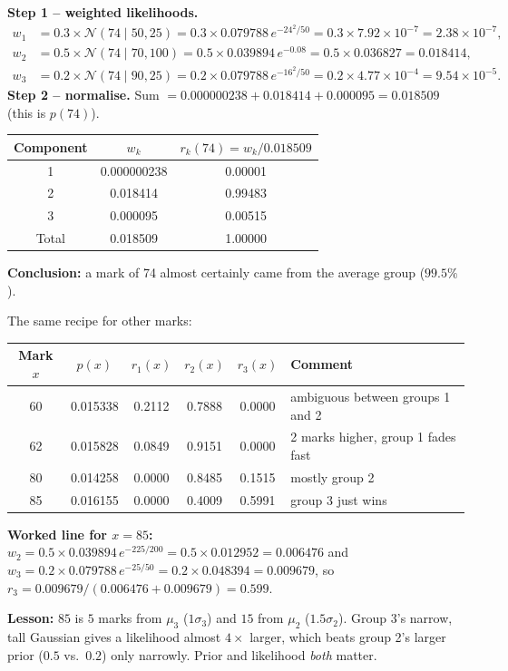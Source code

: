 \documentclass[11pt,a4paper]{article}
\newcommand{\N}{\mathcal{N}}
\begin{document}
\begin{example}
\textbf{Step 1 -- weighted likelihoods.}
\begin{align*}
w_1&=0.3\times\N(74\mid50,25)=0.3\times0.079788\,e^{-24^2/50}=0.3\times7.92\times10^{-7}=2.38\times10^{-7},\\
w_2&=0.5\times\N(74\mid70,100)=0.5\times0.039894\,e^{-0.08}=0.5\times0.036827=0.018414,\\
w_3&=0.2\times\N(74\mid90,25)=0.2\times0.079788\,e^{-16^2/50}=0.2\times4.77\times10^{-4}=9.54\times10^{-5}.
\end{align*}
\textbf{Step 2 -- normalise.} Sum $=0.000000238+0.018414+0.000095=0.018509$ (this is $p(74)$).
\begin{center}
\begin{tabular}{@{}ccc@{}}
\toprule
Component & $w_k$ & $r_k(74)=w_k/0.018509$\\
\midrule
1 & 0.000000238 & 0.00001\\
2 & 0.018414 & 0.99483\\
3 & 0.000095 & 0.00515\\
\midrule
Total & 0.018509 & 1.00000\\
\bottomrule
\end{tabular}
\end{center}
\textbf{Conclusion:} a mark of 74 almost certainly came from the average group ($99.5\%$).
\end{example}

\begin{example}
The same recipe for other marks:
\begin{center}
\begin{tabular}{@{}cccccl@{}}
\toprule
Mark $x$ & $p(x)$ & $r_1(x)$ & $r_2(x)$ & $r_3(x)$ & Comment\\
\midrule
60 & 0.015338 & 0.2112 & 0.7888 & 0.0000 & ambiguous between groups 1 and 2\\
62 & 0.015828 & 0.0849 & 0.9151 & 0.0000 & 2 marks higher, group 1 fades fast\\
80 & 0.014258 & 0.0000 & 0.8485 & 0.1515 & mostly group 2\\
85 & 0.016155 & 0.0000 & 0.4009 & 0.5991 & group 3 just wins\\
\bottomrule
\end{tabular}
\end{center}
\textbf{Worked line for $x=85$:}
$w_2=0.5\times0.039894\,e^{-225/200}=0.5\times0.012952=0.006476$ and
$w_3=0.2\times0.079788\,e^{-25/50}=0.2\times0.048394=0.009679$, so
$r_3=0.009679/(0.006476+0.009679)=0.599$.

\textbf{Lesson:} $85$ is $5$ marks from $\mu_3$ ($1\sigma_3$) and $15$ from $\mu_2$ ($1.5\sigma_2$). Group 3's narrow, tall Gaussian gives a likelihood almost $4\times$ larger, which beats group 2's larger prior ($0.5$ vs.\ $0.2$) only narrowly. Prior and likelihood \emph{both} matter.
\end{example}
\end{document}
